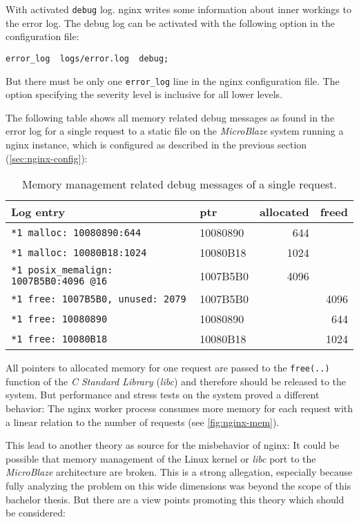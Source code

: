 With activated \texttt{debug} log. nginx writes some information about inner workings to the error log. The debug log can be activated with the following option in the configuration file:

\begin{verbatim}
error_log  logs/error.log  debug;
\end{verbatim}

But there must be only one \texttt{error\_log} line in the nginx configuration file. The option specifying the severity level is inclusive for all lower levels.

The following table shows all memory related debug messages as found in the error log for a single request to a static file on the \textit{MicroBlaze} system running a nginx instance, which is configured as described in the previous section (\ref{sec:nginx-config}):

\begin{table}[H]
\centering
\begin{tabular}{|l|l|r|r|}
    \hline
     \textbf{Log entry} & \textbf{ptr} & \textbf{allocated} & \textbf{freed} \\
    \hline \hline
\texttt{*1 malloc: 10080890:644} & 10080890 & 644 &  \\ \hline
\texttt{*1 malloc: 10080B18:1024} & 10080B18 & 1024 &  \\ \hline
\texttt{*1 posix\_memalign: 1007B5B0:4096 @16} & 1007B5B0 & 4096 &  \\ \hline \hline
\texttt{*1 free: 1007B5B0, unused: 2079} & 1007B5B0 & & 4096 \\ \hline
\texttt{*1 free: 10080890} & 10080890 & & 644 \\ \hline
\texttt{*1 free: 10080B18} & 10080B18 & & 1024 \\ \hline
\end{tabular}
\label{tab:debug_mem}
\caption{Memory management related debug messages of a single request.}
\end{table}

All pointers to allocated memory for one request are passed to the \texttt{free(..)} function of the \textit{C Standard Library} (\textit{libc}) and therefore should be released to the system. But performance and stress tests on the system proved a different behavior: The nginx worker process consumes more memory for each request with a linear relation to the number of requests (see \ref{fig:nginx-mem}).

This lead to another theory as source for the misbehavior of nginx: It could be possible that memory management of the Linux kernel or \textit{libc} port to the \textit{MicroBlaze} architecture are broken. This is a strong allegation, especially because fully analyzing the problem on this wide dimensions was beyond the scope of this bachelor thesis. But there are a view points promoting this theory which should be considered:

